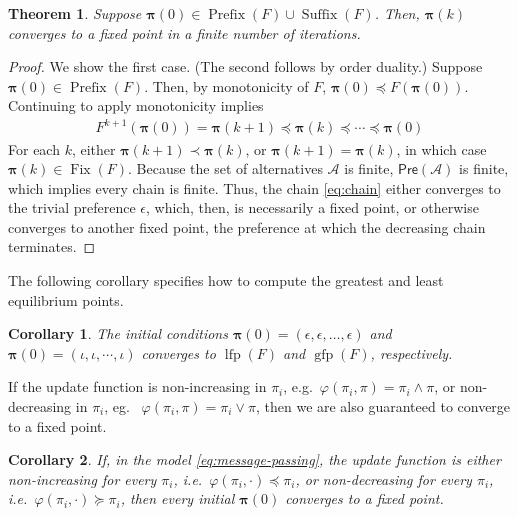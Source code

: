 \documentclass[conference]{ieeeconf}
\newcommand{\A}{\mathcal{A}}
\newcommand{\Pref}{\mathsf{Pre}}
\newcommand{\profile}{\boldsymbol{\pi}}
\newcommand{\join}{\vee}
\newcommand{\meet}{\wedge}
\DeclareMathOperator{\Fix}{Fix}
\DeclareMathOperator{\Pre}{Prefix}
\DeclareMathOperator{\Post}{Suffix}
\DeclareMathOperator{\lfp}{lfp}
\DeclareMathOperator{\gfp}{gfp}
\newtheorem{theorem}{Theorem}
\newtheorem{corollary}{Corollary}
\begin{document}
\begin{theorem} \label{thm:initial-conditions}
    Suppose $\profile(0) \in \Pre(F) \cup \Post(F)$. Then, $\profile(k)$ converges to a fixed point in a finite number of iterations.
\end{theorem}
\begin{proof}
    We show the first case. (The second follows by order duality.) Suppose $\profile(0) \in \Pre(F)$. Then, by monotonicity of $F$, $\profile(0) \preceq F\left(\profile(0) \right)$. Continuing to apply monotonicity implies
    \begin{align}
        F^{k+1}\left( \profile(0)\right)  = \profile(k+1) \preceq \profile(k) \preceq \cdots \preceq \profile(0) \label{eq:chain}
    \end{align} For each $k$, either $\profile(k+1) \prec \profile(k)$, or $\profile(k+1) = \profile(k)$, in which case $\profile(k) \in \Fix(F)$. Because the set of alternatives $\A$ is finite, $\Pref(\A)$ is finite, which implies every chain is finite. Thus, the chain \eqref{eq:chain} either converges to the trivial preference $\epsilon$, which, then, is necessarily a fixed point, or otherwise converges to another fixed point, the preference at which the decreasing chain terminates.
\end{proof}

The following corollary specifies how to compute the greatest and least equilibrium points.

\begin{corollary}
    The initial conditions $\profile(0) = (\epsilon,\epsilon,\dots,\epsilon)$ and $\profile(0) = (\iota,\iota, \cdots, \iota)$ converges to $\lfp(F)$ and $\gfp(F)$, respectively.
\end{corollary}

If the update function is non-increasing in $\pi_i$, e.g.~$\varphi(\pi_i,\pi) = \pi_i \meet \pi$, or non-decreasing in $\pi_i$, eg.~ $\varphi(\pi_i,\pi) = \pi_i \join \pi$, then we are also guaranteed to converge to a fixed point.

\begin{corollary}
    If, in the model \eqref{eq:message-passing}, the update function is either non-increasing for every $\pi_i$, i.e.~$\varphi(\pi_i,\cdot) \preceq \pi_i$, or non-decreasing for every $\pi_i$, i.e.~$\varphi(\pi_i,\cdot) \succeq \pi_i$, then every initial $\profile(0)$ converges to a fixed point.
\end{corollary}
\end{document}
